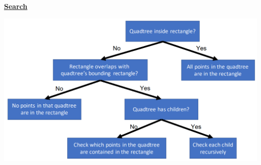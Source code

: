     {\centering\underline{\textbf{Search}}\par}
        \includegraphics[width = \linewidth]{src/5_data_structure/images/quadtree_rectangle.png}
        
    